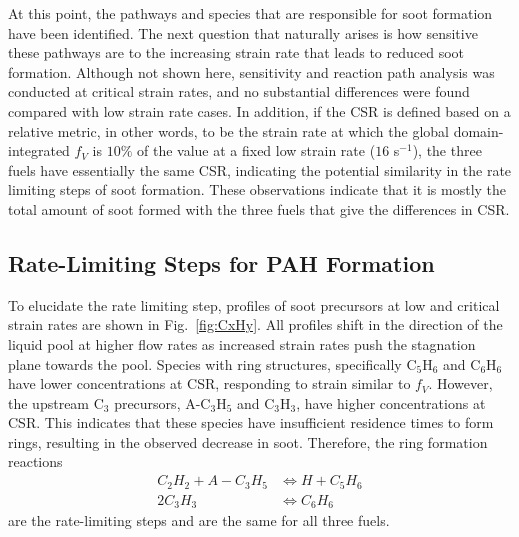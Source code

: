 \documentclass[review,3p,times]{elsarticleUS}
\begin{document}
At this point, the pathways and species that are responsible for soot formation have been identified. The next question that naturally arises is how sensitive these pathways are to the increasing strain rate that leads to reduced soot formation. Although not shown here, sensitivity and reaction path analysis was conducted at critical strain rates, and no substantial differences were found compared with low strain rate cases. In addition, if the CSR is defined based on a relative metric, in other words, to be the strain rate at which the global domain-integrated $f_V$ is $10\%$ of the value at a fixed low strain rate ($16$ s$^{-1}$), the three fuels have essentially the same CSR, indicating the potential similarity in the rate limiting steps of soot formation. These observations indicate that it is mostly the total amount of soot formed with the three fuels that give the differences in CSR.


\subsection{Rate-Limiting Steps for PAH Formation}

To elucidate the rate limiting step, profiles of soot precursors at low and critical strain rates are shown in Fig.~\ref{fig:CxHy}. All profiles shift in the direction of the liquid pool at higher flow rates as increased strain rates push the stagnation plane towards the pool. Species with ring structures, specifically C$_5$H$_6$ and C$_6$H$_6$ have lower concentrations at CSR, responding to strain similar to $f_V$. However, the upstream C$_3$ precursors, A-C$_3$H$_5$ and C$_3$H$_3$, have higher concentrations at CSR. This indicates that these species have insufficient residence times to form rings, resulting in the observed decrease in soot. Therefore, the ring formation reactions
\begin{align*}
  C_2H_2 + A-C_3H_5 &\Longleftrightarrow H + C_5H_6\\
  2 C_3H_3 &\Longleftrightarrow C_6H_6
\end{align*}
are the rate-limiting steps and are the same for all three fuels.
\end{document}
